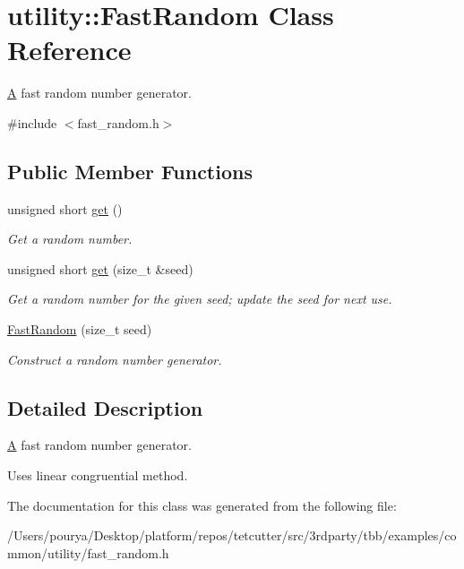 \hypertarget{classutility_1_1FastRandom}{}\section{utility\+:\+:Fast\+Random Class Reference}
\label{classutility_1_1FastRandom}


\hyperlink{structA}{A} fast random number generator.  




{\ttfamily \#include $<$fast\+\_\+random.\+h$>$}

\subsection*{Public Member Functions}
\begin{DoxyCompactItemize}
\item 
\hypertarget{classutility_1_1FastRandom_a0ae73d8ad48c5dce3b9779a219dbed56}{}unsigned short \hyperlink{classutility_1_1FastRandom_a0ae73d8ad48c5dce3b9779a219dbed56}{get} ()\label{classutility_1_1FastRandom_a0ae73d8ad48c5dce3b9779a219dbed56}

\begin{DoxyCompactList}\small\item\em Get a random number. \end{DoxyCompactList}\item 
\hypertarget{classutility_1_1FastRandom_a535957ecb45cd25fbd3e480d0e303067}{}unsigned short \hyperlink{classutility_1_1FastRandom_a535957ecb45cd25fbd3e480d0e303067}{get} (size\+\_\+t \&seed)\label{classutility_1_1FastRandom_a535957ecb45cd25fbd3e480d0e303067}

\begin{DoxyCompactList}\small\item\em Get a random number for the given seed; update the seed for next use. \end{DoxyCompactList}\item 
\hypertarget{classutility_1_1FastRandom_a564fc1184784cf693682a40a23a2b85a}{}\hyperlink{classutility_1_1FastRandom_a564fc1184784cf693682a40a23a2b85a}{Fast\+Random} (size\+\_\+t seed)\label{classutility_1_1FastRandom_a564fc1184784cf693682a40a23a2b85a}

\begin{DoxyCompactList}\small\item\em Construct a random number generator. \end{DoxyCompactList}\end{DoxyCompactItemize}


\subsection{Detailed Description}
\hyperlink{structA}{A} fast random number generator. 

Uses linear congruential method. 

The documentation for this class was generated from the following file\+:\begin{DoxyCompactItemize}
\item 
/\+Users/pourya/\+Desktop/platform/repos/tetcutter/src/3rdparty/tbb/examples/common/utility/fast\+\_\+random.\+h\end{DoxyCompactItemize}

